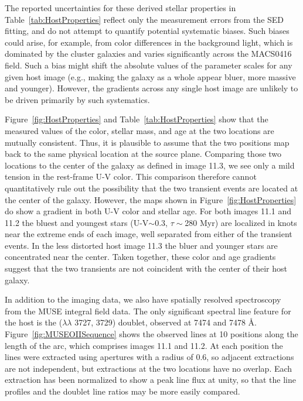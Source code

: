 The reported uncertainties for these derived stellar properties in
Table~\ref{tab:HostProperties} reflect only the measurement errors
from the SED fitting, and do not attempt to quantify potential
systematic biases.  Such biases could arise, for example, from color
differences in the background light, which is dominated by the cluster
galaxies and varies significantly across the MACS0416 field.  Such a
bias might shift the absolute values of the parameter scales for any
given host image (e.g., making the galaxy as a whole appear bluer,
more massive and younger). However, the gradients across any single
host image are unlikely to be driven primarily by such systematics.

Figure~\ref{fig:HostProperties} and Table~\ref{tab:HostProperties}
show that the measured values of the color, stellar mass, and age at
the two \spock locations are mutually consistent. Thus, it is
plausible to assume that the two positions map back to the same
physical location at the source plane.  Comparing those two locations
to the center of the galaxy as defined in image 11.3, we see only a
mild tension in the rest-frame U-V color. This comparison therefore
cannot quantitatively rule out the possibility that the two transient
events are located at the center of the galaxy. However, the maps
shown in Figure~\ref{fig:HostProperties} do show a gradient in both
U-V color and stellar age. For both images 11.1 and 11.2 the bluest
and youngest stars (U-V$\sim$0.3, $\tau\sim$280 Myr) are localized in
knots near the extreme ends of each image, well separated from either
of the \spock transient events.  In the less distorted host image 11.3
the bluer and younger stars are concentrated near the center. Taken
together, these color and age gradients suggest that the two
transients are not coincident with the center of their host galaxy.

In addition to the \HST imaging data, we also have spatially resolved
spectroscopy from the MUSE integral field data. The only significant
spectral line feature for the \spock host is the 
($\lambda\lambda$ 3727, 3729) doublet, observed at 7474 and 7478
\AA. Figure~\ref{fig:MUSEOIISequence} shows the observed
 lines at 10 positions along the length of the arc,
which comprises images 11.1 and 11.2.  At each position the lines were
extracted using apertures with a radius of 0.6\arcsec, so adjacent
extractions are not independent, but extractions at the two \spock
locations have no overlap. Each extraction has been normalized to show
a peak line flux at unity, so that the line profiles and the doublet
line ratios may be more easily compared.

